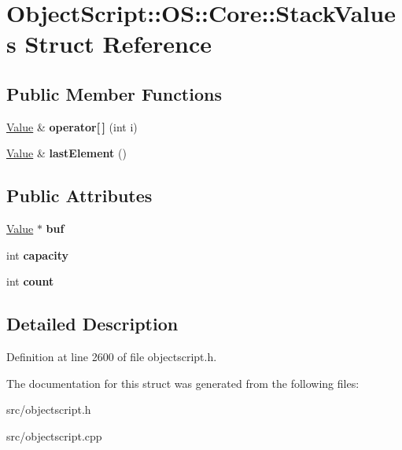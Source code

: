\hypertarget{struct_object_script_1_1_o_s_1_1_core_1_1_stack_values}{}\section{Object\+Script\+:\+:OS\+:\+:Core\+:\+:Stack\+Values Struct Reference}
\label{struct_object_script_1_1_o_s_1_1_core_1_1_stack_values}
\subsection*{Public Member Functions}
\begin{DoxyCompactItemize}
\item 
\hyperlink{struct_object_script_1_1_o_s_1_1_core_1_1_value}{Value} \& {\bfseries operator\mbox{[}$\,$\mbox{]}} (int i)\hypertarget{struct_object_script_1_1_o_s_1_1_core_1_1_stack_values_af6762bbee8c6cdcaff36061e72665fd6}{}\label{struct_object_script_1_1_o_s_1_1_core_1_1_stack_values_af6762bbee8c6cdcaff36061e72665fd6}

\item 
\hyperlink{struct_object_script_1_1_o_s_1_1_core_1_1_value}{Value} \& {\bfseries last\+Element} ()\hypertarget{struct_object_script_1_1_o_s_1_1_core_1_1_stack_values_aae5afd9de727989a417e04e5b6035b6d}{}\label{struct_object_script_1_1_o_s_1_1_core_1_1_stack_values_aae5afd9de727989a417e04e5b6035b6d}

\end{DoxyCompactItemize}
\subsection*{Public Attributes}
\begin{DoxyCompactItemize}
\item 
\hyperlink{struct_object_script_1_1_o_s_1_1_core_1_1_value}{Value} $\ast$ {\bfseries buf}\hypertarget{struct_object_script_1_1_o_s_1_1_core_1_1_stack_values_a1ed351d61a15bb4cfee396638a0cc981}{}\label{struct_object_script_1_1_o_s_1_1_core_1_1_stack_values_a1ed351d61a15bb4cfee396638a0cc981}

\item 
int {\bfseries capacity}\hypertarget{struct_object_script_1_1_o_s_1_1_core_1_1_stack_values_a89d0e08f388e3509ebd5af143fe928a3}{}\label{struct_object_script_1_1_o_s_1_1_core_1_1_stack_values_a89d0e08f388e3509ebd5af143fe928a3}

\item 
int {\bfseries count}\hypertarget{struct_object_script_1_1_o_s_1_1_core_1_1_stack_values_a57d74298de2e60926d885a8895cd9c2c}{}\label{struct_object_script_1_1_o_s_1_1_core_1_1_stack_values_a57d74298de2e60926d885a8895cd9c2c}

\end{DoxyCompactItemize}


\subsection{Detailed Description}


Definition at line 2600 of file objectscript.\+h.



The documentation for this struct was generated from the following files\+:\begin{DoxyCompactItemize}
\item 
src/objectscript.\+h\item 
src/objectscript.\+cpp\end{DoxyCompactItemize}
